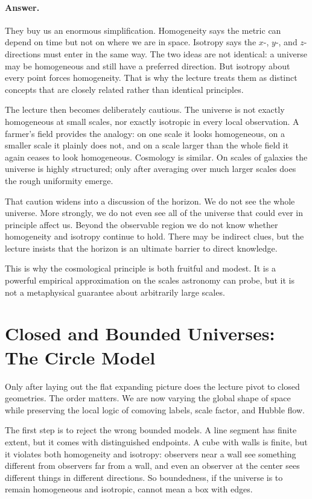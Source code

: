 \paragraph{Answer.} They buy us an enormous simplification. Homogeneity says the metric can depend on time but not on where we are in space. Isotropy says the \(x\)-, \(y\)-, and \(z\)-directions must enter in the same way. The two ideas are not identical: a universe may be homogeneous and still have a preferred direction. But isotropy about every point forces homogeneity. That is why the lecture treats them as distinct concepts that are closely related rather than identical principles.

The lecture then becomes deliberately cautious. The universe is not exactly homogeneous at small scales, nor exactly isotropic in every local observation. A farmer's field provides the analogy: on one scale it looks homogeneous, on a smaller scale it plainly does not, and on a scale larger than the whole field it again ceases to look homogeneous. Cosmology is similar. On scales of galaxies the universe is highly structured; only after averaging over much larger scales does the rough uniformity emerge.

That caution widens into a discussion of the horizon. We do not see the whole universe. More strongly, we do not even see all of the universe that could ever in principle affect us. Beyond the observable region we do not know whether homogeneity and isotropy continue to hold. There may be indirect clues, but the lecture insists that the horizon is an ultimate barrier to direct knowledge.

This is why the cosmological principle is both fruitful and modest. It is a powerful empirical approximation on the scales astronomy can probe, but it is not a metaphysical guarantee about arbitrarily large scales.

\section{Closed and Bounded Universes: The Circle Model}

Only after laying out the flat expanding picture does the lecture pivot to closed geometries. The order matters. We are now varying the global shape of space while preserving the local logic of comoving labels, scale factor, and Hubble flow.

The first step is to reject the wrong bounded models. A line segment has finite extent, but it comes with distinguished endpoints. A cube with walls is finite, but it violates both homogeneity and isotropy: observers near a wall see something different from observers far from a wall, and even an observer at the center sees different things in different directions. So boundedness, if the universe is to remain homogeneous and isotropic, cannot mean a box with edges.

